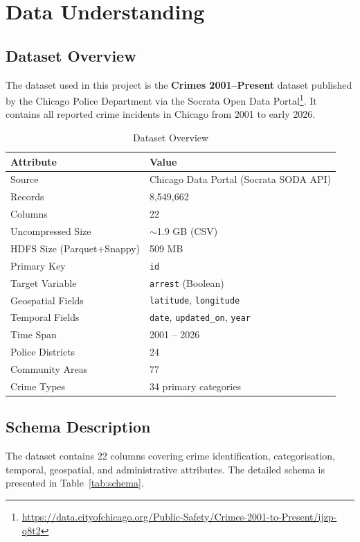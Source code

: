 \section{Data Understanding}
\label{sec:data-understanding}

\subsection{Dataset Overview}

The dataset used in this project is the \textbf{Crimes 2001--Present} dataset published by the Chicago Police Department via the Socrata Open Data Portal\footnote{\url{https://data.cityofchicago.org/Public-Safety/Crimes-2001-to-Present/ijzp-q8t2}}. It contains all reported crime incidents in Chicago from 2001 to early 2026.

\begin{table}[H]
\centering
\caption{Dataset Overview}
\label{tab:dataset-overview}
\begin{tabular}{ll}
\toprule
\textbf{Attribute} & \textbf{Value} \\
\midrule
Source & Chicago Data Portal (Socrata SODA API) \\
Records & 8,549,662 \\
Columns & 22 \\
Uncompressed Size & $\sim$1.9 GB (CSV) \\
HDFS Size (Parquet+Snappy) & 509 MB \\
Primary Key & \texttt{id} \\
Target Variable & \texttt{arrest} (Boolean) \\
Geospatial Fields & \texttt{latitude}, \texttt{longitude} \\
Temporal Fields & \texttt{date}, \texttt{updated\_on}, \texttt{year} \\
Time Span & 2001 -- 2026 \\
Police Districts & 24 \\
Community Areas & 77 \\
Crime Types & 34 primary categories \\
\bottomrule
\end{tabular}
\end{table}

\subsection{Schema Description}

The dataset contains 22 columns covering crime identification, categorisation, temporal, geospatial, and administrative attributes. The detailed schema is presented in Table~\ref{tab:schema}.

